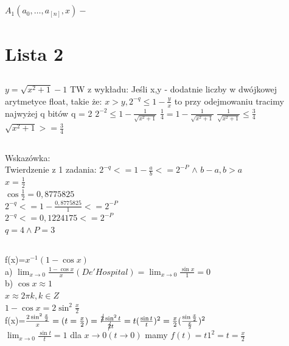 \documentclass{article}
\begin{document}
    \subsection{}
    \begin{math}
        A_{1}(a_{0},\dots,a_[n],x)-
    \end{math}
    \section{Lista 2}
    
    \subsection{}
    $y=\sqrt{x^{2}+1}-1$\newline
    TW z wykładu:\newline
    Jeśli x,y - dodatnie liczby w dwójkowej arytmetyce float, takie że:\newline
    $x>y, 2^{-q}\le 1-\frac{y}{x}$\newline
    to przy odejmowaniu tracimy najwyżej q bitów q = 2\newline
    $2^{-2}\le 1-\frac{1}{\sqrt{x^{2}+1}}$\newline
    $\frac{1}{4}=1-\frac{1}{\sqrt{x^{2}+1}}$\newline
    $\frac{1}{\sqrt{x^{2}+1}}\le \frac{3}{4}$\newline
    $\sqrt{x^{2}+1}>=\frac{3}{4}$\newline

    \subsection{}
    Wskazówka:\\
    Twierdzenie z 1 zadania:
    $2^{-q}<=1-\frac{a}{b}<=2^{-P}$ $\land$ $b-a, b>a$\\
    $x=\frac{1}{2}$\\
    $\cos \frac{1}{2}=0,8775825$\\
    $2^{-q}<=1-\frac{0,8775825}{1}<=2^{-P}$\\
    $2^{-q}<=0,1224175<=2^{-P}$\\
    $q=4 \land P=3$


    \subsection{}
    f(x)=$x^{-1}(1-\cos x)$\\
    a) $\lim_{x \rightarrow 0}\frac{1-\cos x}{x}(De'Hospital)=\lim_{x\rightarrow 0}\frac{\sin x}{1}=0$\\
    b) $\cos x\approx 1$\\
    $x\approx 2\pi k, k \in Z$\\
    $1-\cos x = 2\sin^{2}\frac{x}{2}$\\
    f(x)=$\frac{2\sin^{2}\frac{x}{2}}{x}=(t=\frac{x}{2})=\frac{\cancel{2}\sin^{2}t}{\cancel{2}t}=t(\frac{\sin t}{t})^{2}=\frac{x}{2}(\frac{\sin\frac{x}{2}}{\frac{x}{2}})^{2}$\\
    $\lim_{x\rightarrow0}\frac{\sin t}{t}=1$ dla $x\rightarrow 0(t\rightarrow 0)$ mamy $f(t)=t1^{2}=t=\frac{x}{2}$\\
    
\end{document}
